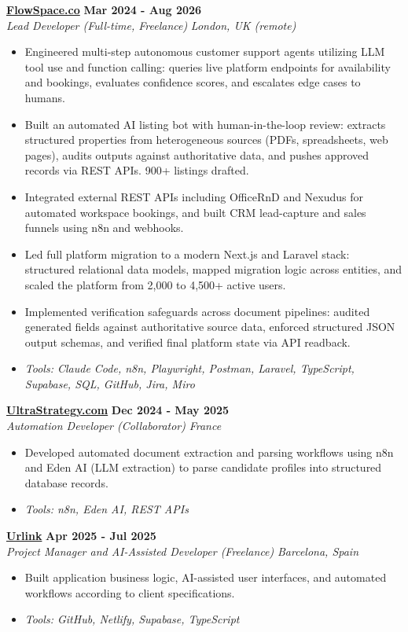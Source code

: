 \documentclass[a4paper,11pt]{article}
\newcommand{\role}[4]{%
 \textbf{#1} \hfill \textbf{#2}\\[1pt]%
 \textit{#3} \hfill \textit{#4}\\[2pt]%
}
\begin{document}
\role{\href{https://flowspace.co}{FlowSpace.co}}{Mar 2024 - Aug 2026}{Lead Developer (Full-time, Freelance)}{London, UK (remote)}
\begin{itemize}
 \item Engineered multi-step autonomous customer support agents utilizing LLM tool use and function calling: queries live platform endpoints for availability and bookings, evaluates confidence scores, and escalates edge cases to humans.
 \item Built an automated AI listing bot with human-in-the-loop review: extracts structured properties from heterogeneous sources (PDFs, spreadsheets, web pages), audits outputs against authoritative data, and pushes approved records via REST APIs. 900+ listings drafted.
 \item Integrated external REST APIs including OfficeRnD and Nexudus for automated workspace bookings, and built CRM lead-capture and sales funnels using n8n and webhooks.
 \item Led full platform migration to a modern Next.js and Laravel stack: structured relational data models, mapped migration logic across entities, and scaled the platform from 2,000 to 4,500+ active users.
 \item Implemented verification safeguards across document pipelines: audited generated fields against authoritative source data, enforced structured JSON output schemas, and verified final platform state via API readback.
 \item \textit{Tools: Claude Code, n8n, Playwright, Postman, Laravel, TypeScript, Supabase, SQL, GitHub, Jira, Miro}
\end{itemize}

\role{\href{https://ultrastrategy.com}{UltraStrategy.com}}{Dec 2024 - May 2025}{Automation Developer (Collaborator)}{France}
\begin{itemize}
 \item Developed automated document extraction and parsing workflows using n8n and Eden AI (LLM extraction) to parse candidate profiles into structured database records.
 \item \textit{Tools: n8n, Eden AI, REST APIs}
\end{itemize}

\role{\href{https://smarturlink.com/}{Urlink}}{Apr 2025 - Jul 2025}{Project Manager and AI-Assisted Developer (Freelance)}{Barcelona, Spain}
\begin{itemize}
 \item Built application business logic, AI-assisted user interfaces, and automated workflows according to client specifications.
 \item \textit{Tools: GitHub, Netlify, Supabase, TypeScript}
\end{itemize}
\end{document}
